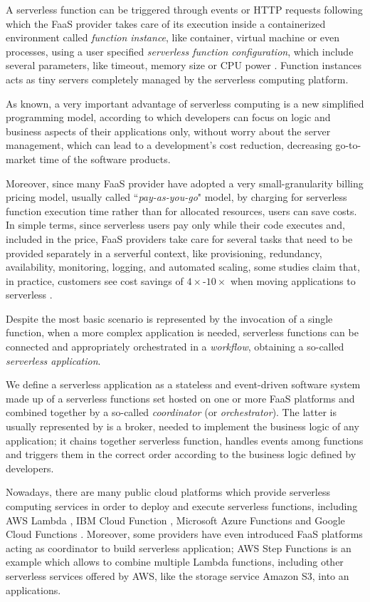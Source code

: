 \documentclass[12pt,a4paper]{report}
\newcommand{\ItalicQuotMark}[1]{``\textit{#1}"}
\begin{document}
A serverless function can be triggered through events or HTTP requests following which the FaaS provider takes care of its execution inside a containerized environment called \textit{function instance}, like container, virtual machine or even processes, using a user specified \textit{serverless function configuration}, which include several parameters, like timeout, memory size or CPU power \cite{COSE}. Function instances acts as tiny servers completely managed by the serverless computing platform. 

As known, a very important advantage of serverless computing is a new simplified programming model, according to which developers can focus on logic and business aspects of their applications only, without worry about the server management, which can lead to a development's cost reduction, decreasing go-to-market time of the software products.

Moreover, since many FaaS provider have adopted a very small-granularity billing pricing model, usually called \ItalicQuotMark{pay-as-you-go} model, by charging for serverless function execution time rather than for allocated resources, users can save costs. In simple terms, since serverless users pay only while their code executes and, included in the price, FaaS providers take care for several tasks that need to be provided separately in a serverful context, like  provisioning, redundancy, availability, monitoring, logging, and automated scaling, some studies claim that, in practice, customers see cost savings of $4\times$-$10\times$ when moving applications to serverless \cite{NextPhase}.

Despite the most basic scenario is represented by the invocation of a single function, when a more complex application is needed, serverless functions can be connected and appropriately orchestrated in a \textit{workflow}, obtaining a so-called \textit{serverless application}.

We define a serverless application as a stateless and event-driven software system made up of a serverless functions set hosted on one or more FaaS platforms and combined together by a so-called \textit{coordinator} (or \textit{orchestrator}). The latter is usually represented by is a broker, needed to implement the business logic of any application; it chains together serverless function, handles events among functions and triggers them in the correct order according to the business logic defined by developers. 

Nowadays, there are many public cloud platforms which provide serverless computing services in order to deploy and execute serverless functions, including AWS Lambda \cite{AWSLambda}, IBM Cloud Function \cite{IBMCloudFunctions}, Microsoft Azure Functions \cite{AzureFunctions} and Google Cloud Functions \cite{GoogleCloud}. Moreover, some providers have even introduced FaaS platforms acting as coordinator to build serverless application; AWS Step Functions is an example which allows to combine multiple Lambda functions, including other serverless services offered by AWS, like the storage service Amazon S3, into an applications. 
\end{document}
